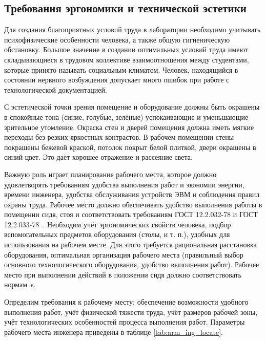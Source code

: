 \subsection{Требования эргономики и технической эстетики}

Для создания благоприятных условий труда в лаборатории необходимо учитывать психофизические особенности человека, а также общую гигиеническую обстановку. 
Большое значение в создании оптимальных условий труда имеют складывающиеся в трудовом коллективе взаимоотношения между студентами, которые принято называть социальным климатом. 
Человек, находящийся в состоянии нервного возбуждения допускает много ошибок при работе с технологической документацией.

С эстетической точки зрения помещение и оборудование должны быть окрашены в спокойные тона (синие, голубые, зелёные) успокаивающие и уменьшающие зрительное утомление. 
Окраска стен и дверей помещения должна иметь мягкие переходы без резких яркостных контрастов. В рабочем помещении стены покрашены бежевой краской, потолок покрыт белой плиткой, двери окрашены в синий цвет. Это даёт хорошее отражение и рассеяние света.

Важную роль играет планирование рабочего места, которое должно удовлетворять требованиям удобства выполнения работ и экономии энергии, времени инженера, удобства обслуживания устройств ЭВМ и соблюдения правил охраны труда. Рабочее место должно обеспечивать удобство выполнения работы в помещении сидя, стоя и соответствовать требованиям ГОСТ 12.2.032-78\cite{gost_sec_ergonom_32} и ГОСТ 12.2.033-78~\cite{gost_sec_ergo_33}. 
Необходим учёт эргономических свойств человека, подбор вспомогательных предметов оборудования (столы, и т. п.), удобных для использования на рабочем месте. Для этого требуется рациональная расстановка оборудования, оптимальная организация рабочего места (правильный выбор основного технологического оборудования, удобство выполнения работ). Рабочее место при выполнении действий в положении сидя должно соответствовать нормам~\cite{gost_sec_ergonom_32}s.

Определим требования к рабочему месту: обеспечение возможности удобного выполнения работ, учёт физической тяжести труда, учёт размеров рабочей зоны, учёт технологических особенностей процесса выполнения работ. Параметры рабочего места инженера приведены в таблице \ref{tab:arm_ing_locate}.

